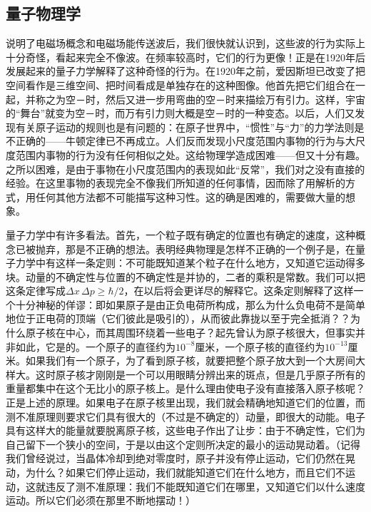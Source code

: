 \documentclass[12pt,oneside]{book}
\begin{document}
\begin{common-format}
\section{量子物理学}
说明了电磁场概念和电磁场能传送波后，我们很快就认识到，这些波的行为实际上十分奇怪，看起来完全不像波。在频率较高时，它们的行为更像！正是在1920年后发展起来的量子力学解释了这种奇怪的行为。在1920年之前，爱因斯坦已改变了把空间看作是三维空间、把时间看成是单独存在的这种图像。他首先把它们组合在一起，并称之为空－时，然后又进一步用弯曲的空－时来描绘万有引力。这样，宇宙的“舞台”就变为空－时，而万有引力则大概是空－时的一种变态。以后，人们又发现有关原子运动的规则也是有问题的：在原子世界中，“惯性”与“力”的力学法则是不正确的——牛顿定律已不再成立。人们反而发现小尺度范围内事物的行为与大尺度范围内事物的行为没有任何相似之处。这给物理学造成困难——但又十分有趣。之所以困难，是由于事物在小尺度范围内的表现如此“反常”，我们对之没有直接的经验。在这里事物的表现完全不像我们所知道的任何事情，因而除了用解析的方式，用任何其他方法都不可能描写这种习性。这的确是困难的，需要做大量的想象。

量子力学中有许多看法。首先，一个粒子既有确定的位置也有确定的速度，这种概念已被抛弃，那是不正确的想法。表明经典物理是怎样不正确的一个例子是，在量子力学中有这样一条定则：不可能既知道某个粒子在什么地方，又知道它运动得多块。动量的不确定性与位置的不确定性是并协的，二者的乘积是常数。我们可以把这条定律写成$ \Delta x\,\Delta p\geq\hbar/2 $，在以后将会更详尽的解释它。这条定则解释了这样一个十分神秘的佯谬：即如果原子是由正负电荷所构成，那么为什么负电荷不是简单地位于正电荷的顶端（它们彼此是吸引的），从而彼此靠拢以至于完全抵消？？为什么原子核在中心，而其周围环绕着一些电子？起先曾认为原子核很大，但事实并非如此，它是的。一个原子的直径约为$ 10^{-8} $厘米，一个原子核的直径约为$ 10^{-13} $厘米。如果我们有一个原子，为了看到原子核，就要把整个原子放大到一个大房间大样大。这时原子核才刚刚是一个可以用眼睛分辨出来的斑点，但是几乎原子所有的重量都集中在这个无比小的原子核上。是什么理由使电子没有直接落入原子核呢？正是上述的原理。如果电子在原子核里出现，我们就会精确地知道它们的位置，而测不准原理则要求它们具有很大的（不过是不确定的）动量，即很大的动能。电子具有这样大的能量就要脱离原子核，这些电子作出了让步：由于不确定性，它们为自己留下一个狭小的空间，于是以由这个定则所决定的最小的运动晃动着。（记得我们曾经说过，当晶体冷却到绝对零度时，原子并没有停止运动，它们仍然在晃动，为什么？如果它们停止运动，我们就能知道它们在什么地方，而且它们不运动，这就违反了测不准原理：我们不能既知道它们在哪里，又知道它们以什么速度运动。所以它们必须在那里不断地摆动！）


\end{common-format}
\end{document}
